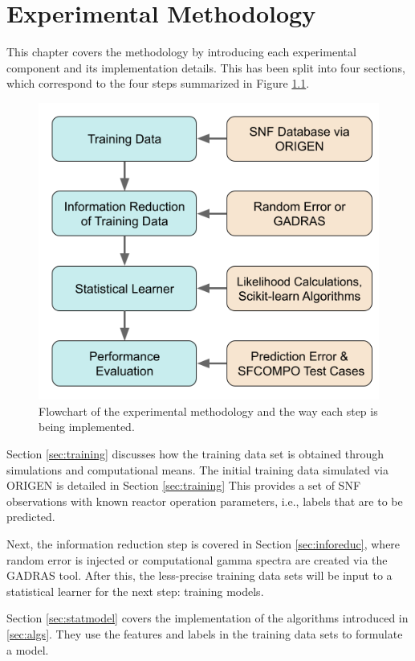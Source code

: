 \chapter{Experimental Methodology}
\label{ch:method}

This chapter covers the methodology by introducing each experimental component
and its implementation details.  This has been split into four sections, which
correspond to the four steps summarized in Figure \ref{fig:method}.

\begin{figure}[!ht]
  \centering
  \includegraphics[width=0.7\linewidth]{./chapters/method/methodology.png}
  \caption{Flowchart of the experimental methodology and the way each step is being implemented.}
  \label{fig:method}
\end{figure}

Section \ref{sec:training} discusses how the training data set is obtained
through simulations and computational means. The initial training data
simulated via \gls{ORIGEN} is detailed in Section \ref{sec:training} This
provides a set of \gls{SNF} observations with known reactor operation
parameters, i.e., labels that are to be predicted.  

Next, the information reduction step is covered in Section \ref{sec:inforeduc},
where random error is injected or computational gamma spectra are created via
the \gls{GADRAS} tool.  After this, the less-precise training data sets will be
input to a statistical learner for the next step: training models.

Section \ref{sec:statmodel} covers the implementation of the algorithms
introduced in \ref{sec:algs}. They use the features and labels in the training
data sets to formulate a model. 

